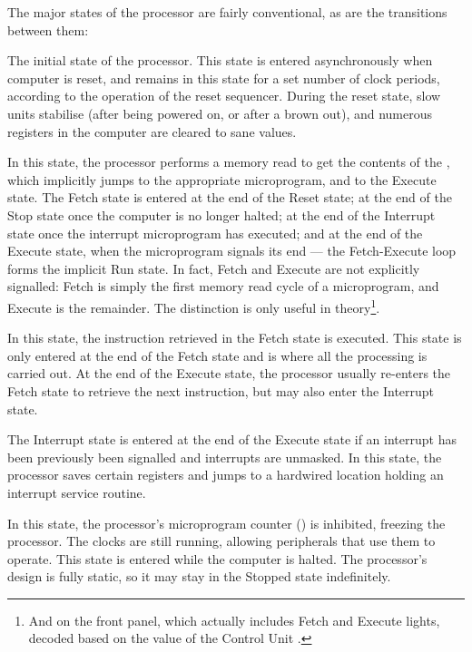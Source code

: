 The major states of the processor are fairly conventional, as are the transitions between them:

\begin{description}
 The initial state of the processor. This state is
  entered asynchronously when computer is reset, and remains in this state for
  a set number of clock periods, according to the operation of the reset
  sequencer. During the reset state, slow units stabilise (after being powered
  on, or after a brown out), and numerous registers in the computer are cleared
  to sane values.

 In this state, the processor performs a memory read to
  get the contents of the \IR, which implicitly jumps to the appropriate
  microprogram, and to the Execute state. The Fetch state is entered at the end
  of the Reset state; at the end of the Stop state once the computer is no
  longer halted; at the end of the Interrupt state once the interrupt
  microprogram has executed; and at the end of the Execute state, when the
  microprogram signals its end — the Fetch-Execute loop forms the implicit Run
  state. In fact, Fetch and Execute are not explicitly signalled: Fetch is
  simply the first memory read cycle of a microprogram, and Execute is the
  remainder. The distinction is only useful in theory\footnote{And on the front
    panel, which actually includes Fetch and Execute lights, decoded based on
    the value of the Control Unit .}.

 In this state, the instruction retrieved in the
  Fetch state is executed. This state is only entered at the end of the Fetch
  state and is where all the processing is carried out. At the end of the
  Execute state, the processor usually re-enters the Fetch state to retrieve
  the next instruction, but may also enter the Interrupt state.

 The Interrupt state is entered at the end of the
  Execute state if an interrupt has been previously been signalled and
  interrupts are unmasked. In this state, the processor saves certain registers
  and jumps to a hardwired location holding an interrupt service routine.

 In this state, the processor's microprogram counter
  (\UPC) is inhibited, freezing the processor. The clocks are still
  running, allowing peripherals that use them to operate. This state is entered
  while the computer is halted. The processor's design is fully static, so it
  may stay in the Stopped state indefinitely.

\end{description}

